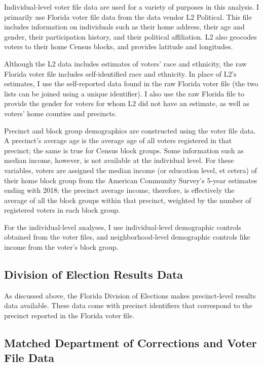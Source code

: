 \documentclass[
  12pt,
]{article}
\begin{document}
Individual-level voter file data are used for a variety of purposes in this analysis. I primarily use Florida voter file data from the data vendor L2 Political. This file includes information on individuals such as their home address, their age and gender, their participation history, and their political affiliation. L2 also geocodes voters to their home Census blocks, and provides latitude and longitudes.

Although the L2 data includes estimates of voters' race and ethnicity, the raw Florida voter file includes self-identified race and ethnicity. In place of L2's estimates, I use the self-reported data found in the raw Florida voter file (the two lists can be joined using a unique identifier). I also use the raw Florida file to provide the gender for voters for whom L2 did not have an estimate, as well as voters' home counties and precincts.

Precinct and block group demographics are constructed using the voter file data. A precinct's average age is the average age of all voters registered in that precinct; the same is true for Census block groups. Some information such as median income, however, is not available at the individual level. For these variables, voters are assigned the median income (or education level, et cetera) of their home block group from the American Community Survey's 5-year estimates ending with 2018; the precinct average income, therefore, is effectively the average of all the block groups within that precinct, weighted by the number of registered voters in each block group.

For the individual-level analyses, I use individual-level demographic controls obtained from the voter files, and neighborhood-level demographic controls like income from the voter's block group.

\hypertarget{division-of-election-results-data}{%
\subsection*{Division of Election Results Data}\label{division-of-election-results-data}}

As discussed above, the Florida Division of Elections makes precinct-level results data available. These data come with precinct identifiers that correspond to the precinct reported in the Florida voter file.

\hypertarget{matched-department-of-corrections-and-voter-file-data}{%
\subsection*{Matched Department of Corrections and Voter File Data}\label{matched-department-of-corrections-and-voter-file-data}}
\end{document}
